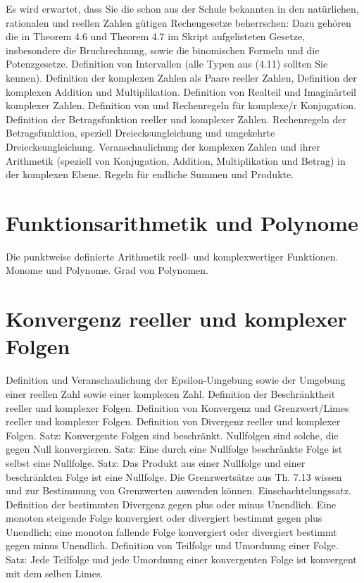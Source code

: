 \documentclass[10pt,a4paper]{article}
\begin{document}
Es wird erwartet, dass Sie die schon aus der Schule bekannten in den natürlichen, rationalen und reellen Zahlen gütigen Rechengesetze beherrschen: Dazu gehören die in Theorem 4.6 und Theorem 4.7 im Skript aufgelisteten Gesetze, insbesondere die Bruchrechnung, sowie die binomischen Formeln und die Potenzgesetze. Definition von Intervallen (alle Typen aus (4.11) sollten Sie kennen). Definition der komplexen Zahlen als Paare reeller Zahlen, Definition der komplexen Addition und Multiplikation. Definition von Realteil und Imaginärteil komplexer Zahlen. Definition von und Rechenregeln für komplexe/r Konjugation. Definition der Betragsfunktion reeller und komplexer Zahlen. Rechenregeln der Betragsfunktion, speziell Dreiecksungleichung und umgekehrte Dreiecksungleichung. Veranschaulichung der komplexen Zahlen und ihrer Arithmetik (speziell von Konjugation, Addition, Multiplikation und Betrag) in der komplexen Ebene. Regeln für endliche Summen und Produkte. 

\section{Funktionsarithmetik und Polynome}
 
Die punktweise definierte Arithmetik reell- und komplexwertiger Funktionen. Monome und Polynome. Grad von Polynomen. 

\section{Konvergenz reeller und komplexer Folgen}
 
Definition und Veranschaulichung der Epsilon-Umgebung sowie der Umgebung einer reellen Zahl sowie einer komplexen Zahl. Definition der Beschränktheit reeller und komplexer Folgen. Definition von Konvergenz und Grenzwert/Limes reeller und komplexer Folgen. Definition von Divergenz reeller und komplexer Folgen. Satz: Konvergente Folgen sind beschränkt. Nullfolgen sind solche, die gegen Null konvergieren. Satz: Eine durch eine Nullfolge beschränkte Folge ist selbst eine Nullfolge. Satz: Das Produkt aus einer Nullfolge und einer beschränkten Folge ist eine Nullfolge. Die Grenzwertsätze aus Th. 7.13 wissen und zur Bestimmung von Grenzwerten anwenden können. Einschachtelungssatz. Definition der bestimmten Divergenz gegen plus oder minus Unendlich. Eine monoton steigende Folge konvergiert oder divergiert bestimmt gegen plus Unendlich; eine monoton fallende Folge konvergiert oder divergiert bestimmt gegen minus Unendlich. Definition von Teilfolge und Umordnung einer Folge. Satz: Jede Teilfolge und jede Umordnung einer konvergenten Folge ist konvergent mit dem selben Limes. 
\end{document}

